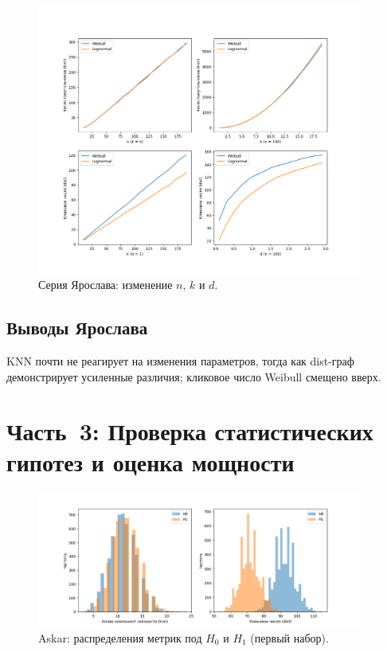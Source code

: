 \documentclass[a4paper,12pt]{article}
\begin{document}
\begin{figure}[H]
    \centering
    \includegraphics[width=0.95\textwidth]{part2_results_Yaroslav.png}
    \caption{Серия Ярослава: изменение $n$, $k$ и $d$.}
    \label{fig:part2-yaroslav}
\end{figure}

\subsection*{Выводы Ярослава }
KNN почти не реагирует на изменения параметров, тогда как dist-граф демонстрирует усиленные различия; кликовое число Weibull смещено вверх.

\section*{Часть 3: Проверка статистических гипотез и оценка мощности}

\begin{figure}[H]
    \centering
    \includegraphics[width=0.95\textwidth]{part3_results_0_Askar.png}
    \caption{Askar: распределения метрик под $H_0$ и $H_1$ (первый набор).}
    \label{fig:part3-0-askar}
\end{figure}
\end{document}
